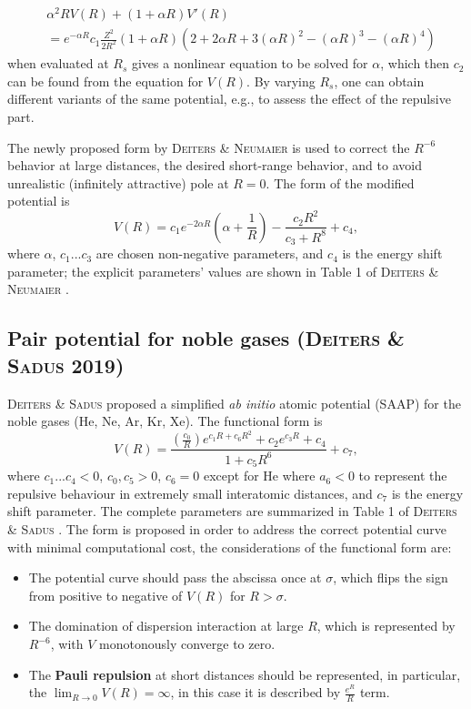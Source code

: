\documentclass[12pt]{article}
\def\D{\displaystyle}
\begin{document}
\begin{equation}
    \begin{split}
        &\alpha^2RV(R) + (1 + \alpha R)V'(R) \\ & = 
        e^{-\alpha R} 
        c_1\frac{Z^2}{2R^2}(1+\alpha R)
        (2 + 2 \alpha R + 3(\alpha R)^2 - (\alpha R)^3 - (\alpha R)^4)
    \end{split}
\end{equation}
when evaluated at $R_s$ gives a nonlinear equation to be solved for $\alpha$, which then $c_2$ can be found from the equation for $V(R)$. By varying $R_s$, one can obtain different variants of the same potential, e.g., to assess the effect of the repulsive part.

The newly proposed form by \textsc{Deiters \& Neumaier} \cite{idx178} is used to correct the $R^{-6}$ behavior at large distances, the desired short-range behavior, and to avoid unrealistic (infinitely attractive) pole at $R=0$.
The form of the modified potential is
\begin{equation}
    V(R) = c_1 e^{-2\alpha R}\left(\alpha + \frac{1}{R}\right) - \frac{c_2R^2}{c_3 + R^8} + c_4,
    \label{eq:ljlike}
\end{equation}
where $\alpha$, $c_1$...$c_3$ are chosen non-negative parameters, and $c_4$ is the energy shift parameter; the explicit parameters' values are shown in Table 1 of \textsc{Deiters \& Neumaier} \cite{idx178}.

\subsection{Pair potential for noble gases (\textsc{Deiters \& Sadus} 2019)}
\textsc{Deiters \& Sadus} \cite{idx179} proposed a simplified \textit{ab initio} atomic potential (SAAP) for the noble gases (He, Ne, Ar, Kr, Xe). The functional form is
\begin{equation}
    V(R) = \frac{\left(\D\frac{c_0}{R}\right)e^{c_1R+c_6R^2} 
    + c_2e^{c_3R} + c_4}
    {1+ c_5R^6} + c_7,
\end{equation}
where $c_1...c_4<0$, $c_0, c_5 > 0$, $c_6 = 0$ except for He where $a_6<0$ to represent the repulsive behaviour in extremely small interatomic distances, and $c_7$ is the energy shift parameter. The complete parameters are summarized in Table 1 of \textsc{Deiters \& Sadus} \cite{idx179}. The form is proposed in order to address the correct potential curve with minimal computational cost, the considerations of the functional form are:
\begin{itemize}
    \item The potential curve should pass the abscissa once at $\sigma$, which flips the sign from positive to negative of $V(R)$ for $R > \sigma$.
    \item The domination of dispersion interaction at large $R$, which is represented by $R^{-6}$, with $V$ monotonously converge to zero.
    \item The \textbf{Pauli repulsion} at short distances should be represented, in particular, the $\lim_{R \rightarrow 0} V(R) = \infty$, in this case it is described by $\D \frac{e^R}{R}$ term.
\end{itemize}
\end{document}
